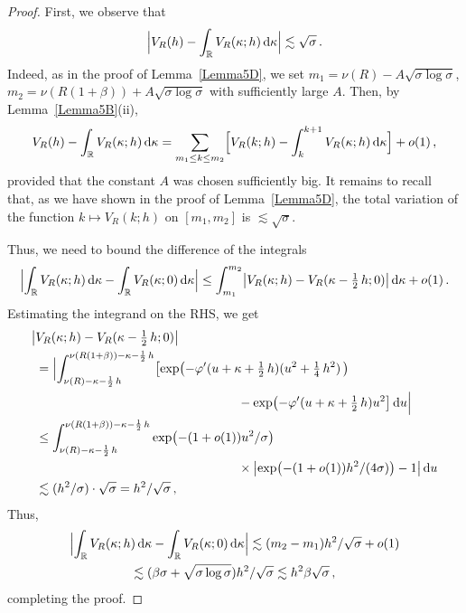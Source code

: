 \documentclass[11pt]{amsart}
\numberwithin{equation}{section}
\newcommand{\bR}{\mathbb R}
\begin{document}
\begin{proof}
First, we observe that
\[
\Bigl| V_R(h) - \int_{\bR} V_R(\kappa; h)\, {\rm d}\kappa \Bigr|
\lesssim \sqrt{\sigma}\,.
\]
Indeed, as in the proof of Lemma~\ref{Lemma5D}, we set
$m_1 = \nu(R) - A\sqrt{\sigma\log\sigma}$, $m_2 = \nu(R(1+\beta)) +A\sqrt{\sigma\log\sigma}$
with sufficiently large $A$. Then, by Lemma~\ref{Lemma5B}(ii),
\[
V_R(h) - \int_{\bR} V_R(\kappa; h)\, {\rm d}\kappa
= \sum_{m_1 \le k \le m_2} \Bigl[ V_R(k; h) -
\int_k^{k+1} V_R(\kappa; h)\, {\rm d}\kappa \Bigr] + o(1)\,,
\]
provided that the constant $A$ was chosen sufficiently big. It remains to recall that,
as we have shown in the proof of Lemma~\ref{Lemma5D}, the total variation of the function
$k\mapsto V_R(k; h)$ on $[m_1, m_2]$ is $\lesssim\sqrt{\sigma}$.

Thus, we need to bound the difference of the integrals
\[
\Bigl| \int_{\bR} V_R(\kappa; h)\, {\rm d}\kappa -
\int_{\bR} V_R(\kappa; 0)\, {\rm d}\kappa\Bigr|
\le \int_{m_1}^{m_2} \bigl| V_R(\kappa; h) - V_R(\kappa-\tfrac12\, h; 0) \bigr|\, {\rm d}\kappa
+ o(1)\,.
\]
Estimating the integrand on the RHS, we get
\begin{align*}
\bigl|&V_R(\kappa; h) - V_R(\kappa-\tfrac12\, h; 0) \bigr| \\
&=
\Bigl|
\int_{\nu(R)-\kappa-\frac12\, h}^{\nu (R(1+\beta))-\kappa-\frac12\, h}
\bigl[ \exp\bigl( -\varphi'(u+\kappa+\tfrac12\, h)(u^2 + \tfrac14\, h^2)\,\bigr)\\
&\qquad\qquad\qquad\qquad\qquad\qquad\qquad\qquad -\exp\bigl( -\varphi'(u+\kappa+\tfrac12\, h)u^2 \bigr]\, {\rm d}u
\Bigr| \\
&\le \int_{\nu(R)-\kappa-\frac12\, h}^{\nu (R(1+\beta))-\kappa-\frac12\, h}
\exp\bigl( - (1+o(1))u^2/\sigma \bigr)\\
&\qquad\qquad\qquad\qquad\qquad\qquad\qquad\qquad\times\bigl| \exp\bigl( -(1+o(1))h^2/(4\sigma) \bigr) - 1\bigr|\, {\rm d}u
\\
&\lesssim (h^2/\sigma) \cdot \sqrt{\sigma} = h^2/\sqrt{\sigma}\,,
\end{align*}
Thus,
\begin{multline*}
\Bigl| \int_{\bR} V_R(\kappa; h)\, {\rm d}\kappa -
\int_{\bR} V_R(\kappa; 0)\, {\rm d}\kappa\Bigr|
\lesssim (m_2-m_1)h^2/\sqrt{\sigma} + o(1) \\
\lesssim (\beta\sigma + \sqrt{\sigma\log\sigma})h^2/\sqrt{\sigma}
\lesssim h^2\beta\sqrt{\sigma}\,,
\end{multline*}
completing the proof.
\end{proof}
\end{document}
